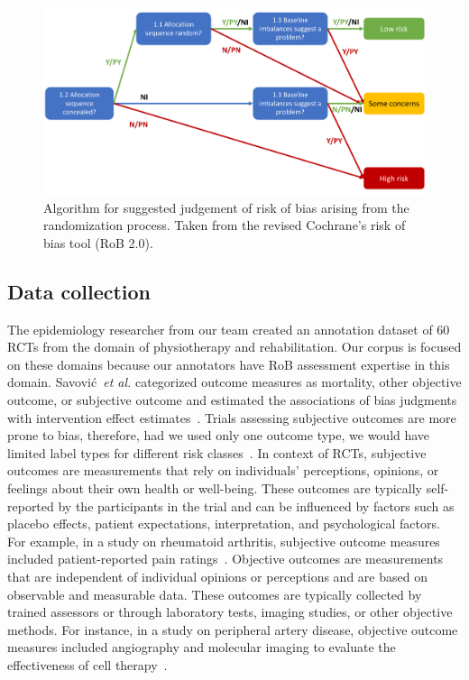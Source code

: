 \documentclass[sn-mathphys,Numbered]{sn-jnl}%
\theoremstyle{thmstyleone}%
\theoremstyle{thmstyletwo}%
\theoremstyle{thmstylethree}%
\begin{document}
%
%
%
\begin{figure}
    \centering
    \includegraphics[width=0.60\columnwidth]{figures/flowchart.pdf}
    \caption{Algorithm for suggested judgement of risk of bias arising from the randomization process. Taken from the revised Cochrane's risk of bias tool (RoB 2.0).}
    \label{fig:flowchart}
\end{figure}
%
%
%

%
%
%
\subsection{Data collection}
\label{data}
%
The epidemiology researcher from our team created an annotation dataset of 60 RCTs from the domain of physiotherapy and rehabilitation.
Our corpus is focused on these domains because our annotators have RoB assessment expertise in this domain.
Savović~\textit{et al.} categorized outcome measures as mortality, other objective outcome, or subjective outcome and estimated the associations of bias judgments with intervention effect estimates~\cite{savovic2018association}.
Trials assessing subjective outcomes are more prone to bias, therefore, had we used only one outcome type, we would have limited label types for different risk classes~\cite{page2016empirical}.
In context of RCTs, subjective outcomes are measurements that rely on individuals' perceptions, opinions, or feelings about their own health or well-being.
These outcomes are typically self-reported by the participants in the trial and can be influenced by factors such as  placebo effects, patient expectations, interpretation, and psychological factors.
For example, in a study on rheumatoid arthritis, subjective outcome measures included patient-reported pain ratings~\cite{vollert2020assessment}.
Objective outcomes are measurements that are independent of individual opinions or perceptions and are based on observable and measurable data.
These outcomes are typically collected by trained assessors or through laboratory tests, imaging studies, or other objective methods.
For instance, in a study on peripheral artery disease, objective outcome measures included angiography and molecular imaging to evaluate the effectiveness of cell therapy~\cite{grimaldi2016imaging}.
\end{document}
